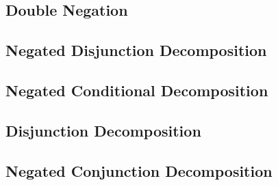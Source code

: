 \documentclass[12pt,a4paper,openany]{article}
\begin{document}
\subsection{Double Negation}
\begin{center}
\end{center}

\subsection{Negated Disjunction Decomposition}
\begin{center}
\end{center}

\subsection{Negated Conditional Decomposition }

\begin{center}
\end{center}

\subsection{Disjunction Decomposition}
\begin{center}
\boxed{
\begin{minipage}{6cm}
\centering
\begin{forest}
%
[{$A \lor B$}
[{$A$}]
[{$B$}]
]
\end{forest}
\end{minipage}
}
\end{center}

\subsection {Negated Conjunction Decomposition }
\begin{center}
\end{center}
\end{document}
